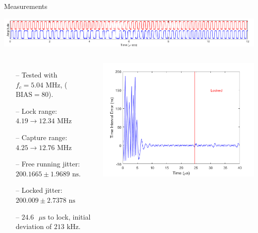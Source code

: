 \documentclass{beamer}
\begin{document}
\begin{frame}{Measurements}
	\vspace*{-5mm}
	\begin{center}
		\includegraphics[scale=0.425]{../impl_waveform}
	\end{center}
   	\begin{columns}
    	\begin{itemize}
            \item[--]
                Tested with $f_c=5.04\textrm{ MHz}$, ($\textrm{BIAS}=80$).
    		\item[--]
	    		Lock range: $4.19\rightarrow12.34\textrm{ MHz}$ 
            \item[--]
                Capture range: $4.25\rightarrow12.76\textrm{ MHz}$
            \item[--]
                Free running jitter: $200.1665\pm1.9689\textrm{ ns}$.
            \item[--]
                Locked jitter: $200.009\pm2.7378\textrm{ ns}$
            \item[--]
                $24.6\textrm{ }\mu\textrm{s}$ to lock, initial deviation of $213\textrm{ kHz}$. 
        \end{itemize}
    	
    	\includegraphics[scale=0.4]{../impl_locking}
    \end{columns}
\end{frame}
\end{document}
